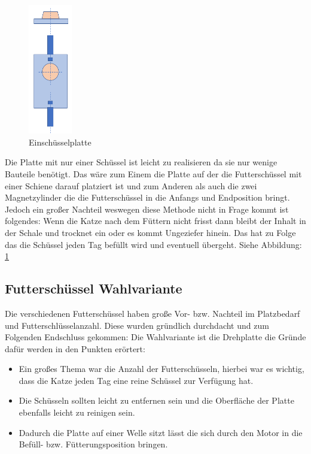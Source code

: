 \begin{figure}
\vspace{-40pt}
  \begin{center}
    \includegraphics[width=0.17\textwidth]{Bilder/Powerpoint/Einschuessel_platte}
  \end{center}
  \caption{Einschüsselplatte}
  \label{Schüssel Eins}
  \vspace{-10pt}
\end{figure}

Die Platte mit nur einer Schüssel ist leicht zu realisieren da sie nur wenige Bauteile benötigt. Das wäre zum Einem die Platte auf der die Futterschüssel mit einer Schiene darauf platziert ist und zum Anderen als auch die zwei Magnetzylinder die die Futterschüssel in die Anfangs und Endposition bringt. Jedoch ein großer Nachteil weswegen diese Methode nicht in Frage kommt ist folgendes: Wenn die Katze nach dem Füttern nicht frisst dann bleibt der Inhalt in der Schale und trocknet ein oder es kommt Ungeziefer hinein. Das hat zu Folge das die Schüssel jeden Tag befüllt wird und eventuell übergeht. Siehe Abbildung: \ref{Schüssel Eins} 

\subsection{Futterschüssel Wahlvariante}

Die verschiedenen Futterschüssel haben große Vor- bzw. Nachteil im Platzbedarf und Futterschlüsselanzahl. Diese wurden gründlich durchdacht und zum Folgenden Endschluss gekommen: Die Wahlvariante ist die Drehplatte die Gründe dafür werden in den Punkten erörtert: 

\begin{itemize}
\item Ein großes Thema war die Anzahl der Futterschüsseln, hierbei war es wichtig, dass die Katze jeden Tag eine reine Schüssel zur Verfügung hat.
\item Die Schüsseln sollten leicht zu entfernen sein und die Oberfläche der Platte ebenfalls leicht zu reinigen sein.
\item Dadurch die Platte auf einer Welle sitzt lässt die sich durch den Motor in die Befüll- bzw. Fütterungsposition bringen.
\end{itemize} 

